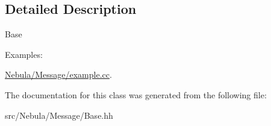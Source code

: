 \subsection{\-Detailed \-Description}
\-Base 

\begin{Desc}
\item[\-Examples\-: ]\par
\hyperlink{Nebula_2Message_2example_8cc-example}{\-Nebula/\-Message/example.\-cc}.\end{Desc}


\-The documentation for this class was generated from the following file\-:\begin{DoxyCompactItemize}
\item 
src/\-Nebula/\-Message/\-Base.\-hh\end{DoxyCompactItemize}

